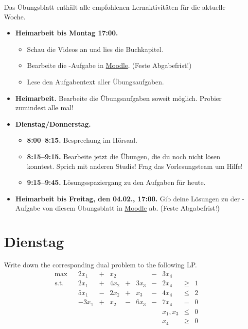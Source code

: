 \documentclass{uebung_cs}
\begin{document}
Das Übungsblatt enthält alle empfohlenen Lernaktivitäten für die aktuelle Woche.

\begin{itemize}
\item \textbf{Heimarbeit bis Montag 17:00.}
    \begin{itemize}
    \item 
    Schau die Videos an und lies die Buchkapitel.
    \item Bearbeite die -Aufgabe in \href{https://moodle.studiumdigitale.uni-frankfurt.de/moodle/course/view.php?id=2241}{Moodle}. (Feste Abgabefrist!)
    \item Lese den Aufgabentext aller Übungsaufgaben.
    \end{itemize}
\item \textbf{Heimarbeit.} Bearbeite die Übungsaufgaben soweit möglich. Probier zumindest alle mal!
\item \textbf{Dienstag/Donnerstag.}
\begin{itemize}
    \item \textbf{8:00--8:15.} Besprechung im Hörsaal.
    \item \textbf{8:15--9:15.} Bearbeite jetzt die Übungen, die du noch nicht lösen konntest. Sprich mit anderen Studis! Frag das Vorlesungsteam um Hilfe!
    \item \textbf{9:15--9:45.} Lösungsspaziergang zu den Aufgaben für heute.
\end{itemize}

\item \textbf{Heimarbeit bis Freitag, den 04.02., 17:00.} Gib deine Lösungen zu der -Aufgabe von diesem Übungsblatt in \href{https://moodle.studiumdigitale.uni-frankfurt.de/moodle/course/view.php?id=2241}{Moodle} ab. (Feste Abgabefrist!)
\end{itemize}

\section*{Dienstag}

\begin{aufgabe}
	Write down the corresponding dual problem to the following \acs{LP}.
	\[
		\begin{array}{rrrlllllllll}
		\text{max}    &     &   2 x_1       &   +     &   x_2   &       &         &   -   & 3x_4  &         &   \\
		\text{s.t.}  &     &   2x_1      &   +     &   4x_2  &   +   &  3 x_3   &   -   & 2x_4   &  \geq   & 1 \\
							&     &   5x_1      &   -     &   2x_2   &   +   &   x_3  &   -   & 4x_4  &  \leq   & 2 \\
							&     &   -3x_1     & +     &   x_2  &   -   &   6x_3  &   -   & 7 x_4   &   =     & 0 \\
							&     &           &       &         &       &       &         &x_1,x_3   & \leq    &   0      \\
							&     &          &       &         &       &       &         &  x_4       & \geq    &   0    
		\end{array}
	\]
	
\end{aufgabe}
\end{document}
